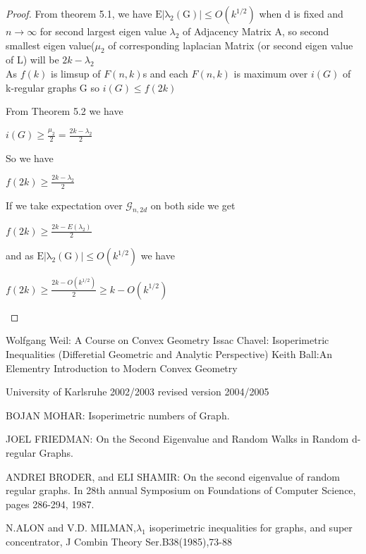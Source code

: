 \documentclass[oneside]{book}
\begin{document}
   
\begin{proof} From theorem 5.1, we have  $\mathrm{E|\lambda_{2}(G)|}
    \leq O(k^{1/2})$ when d is fixed and $n\rightarrow \infty$ for second largest eigen value $\lambda_{2}$ of Adjacency Matrix A, so second smallest eigen value($\mu_{2}$ of corresponding laplacian Matrix (or second eigen value of L) will be $2k - \lambda_{2}$ \\
     
     
   As $f(k)$ is limsup of $F(n,k)$s and each $F(n,k)$ is maximum over $i(G)$ of k-regular graphs G
   so $i(G)\leq f(2k)$
   
    From Theorem 5.2 we have
    \begin{center}
        $i(G) \geq \frac{\mu_2}{2} = \frac{2k - \lambda_{2}}{2} $ 
    \end{center}
    So we have
    
    \begin{center}
        $ f(2k) \geq \frac{2k - \lambda_{2}}{2}$
    \end{center}
  
      If we take expectation over $\mathscr{G}_{n, 2 d}$ on both side we get 
      \begin{center}
           $ f(2k) \geq \frac{2k - E(\lambda_{2})}{2}$
      \end{center}
      and as $\mathrm{E|\lambda_{2}(G)|}
    \leq O(k^{1/2})$ we have 
 \begin{center}
    $f(2k) \geq \frac{2k - O(k^{1/2})}{2} \geq k - O(k^{1/2}) $ 
 \end{center}
    
  \end{proof}  
    
  
\begin{thebibliography}{300}

 \label{t:21} 
Wolfgang Weil: A Course
on
Convex Geometry
Issac Chavel: Isoperimetric Inequalities (Differetial Geometric and Analytic Perspective)
Keith Ball:An Elementry Introduction to Modern Convex Geometry

University of Karlsruhe
2002/2003
revised version 2004/2005

     BOJAN MOHAR: Isoperimetric numbers of Graph.
     
    

     JOEL FRIEDMAN: On the Second Eigenvalue and Random Walks in Random d-regular Graphs.
     
     ANDREI BRODER, and ELI SHAMIR: On the second eigenvalue of random regular graphs. In 28th annual Symposium on Foundations of Computer Science, pages 286-294, 1987. 
     
      N.ALON and V.D. MILMAN,$\lambda_{1}$ isoperimetric inequalities for graphs, and super concentrator, J Combin Theory Ser.B38(1985),73-88  

  \end{thebibliography}  
    
       
    
\end{document}
